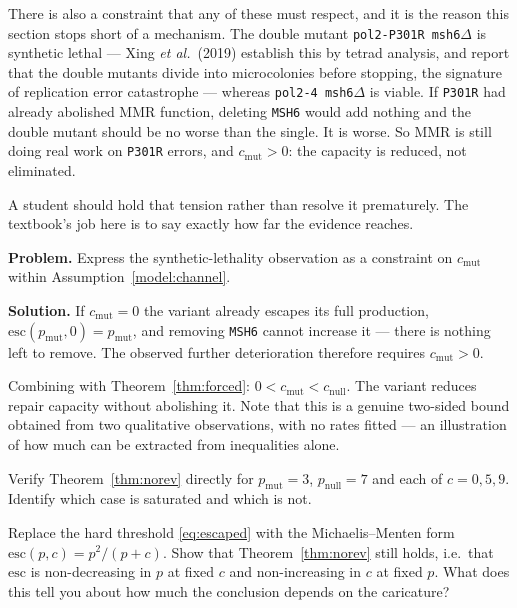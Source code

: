 There is also a constraint that any of these must respect, and it is the reason
this section stops short of a mechanism. The double mutant
\texttt{pol2-P301R msh6$\Delta$} is synthetic lethal --- Xing \emph{et al.}\ (2019)
establish this by tetrad analysis, and report that the double mutants divide into
microcolonies before stopping, the signature of replication error catastrophe ---
whereas \texttt{pol2-4 msh6$\Delta$} is viable. If \texttt{P301R} had already
abolished MMR function, deleting \texttt{MSH6} would add nothing and the double
mutant should be no worse than the single. It is worse. So MMR is still doing
real work on \texttt{P301R} errors, and $c_{\mathrm{mut}} > 0$: the capacity is
reduced, not eliminated.

A student should hold that tension rather than resolve it prematurely. The
textbook's job here is to say exactly how far the evidence reaches.

\begin{worked}
\textbf{Problem.} Express the synthetic-lethality observation as a constraint on
$c_{\mathrm{mut}}$ within Assumption~\ref{model:channel}.

\textbf{Solution.} If $c_{\mathrm{mut}} = 0$ the variant already escapes its full
production, $\mathrm{esc}(p_{\mathrm{mut}}, 0) = p_{\mathrm{mut}}$, and removing
\texttt{MSH6} cannot increase it --- there is nothing left to remove. The observed
further deterioration therefore requires $c_{\mathrm{mut}} > 0$.

Combining with Theorem~\ref{thm:forced}: $0 < c_{\mathrm{mut}} < c_{\mathrm{null}}$.
The variant reduces repair capacity without abolishing it. Note that this is a
genuine two-sided bound obtained from two qualitative observations, with no rates
fitted --- an illustration of how much can be extracted from inequalities alone.
\end{worked}

\begin{exercise}
Verify Theorem~\ref{thm:norev} directly for $p_{\mathrm{mut}} = 3$,
$p_{\mathrm{null}} = 7$ and each of $c = 0, 5, 9$. Identify which case is
saturated and which is not.
\end{exercise}

\begin{exercise}
Replace the hard threshold \eqref{eq:escaped} with the Michaelis--Menten form
$\mathrm{esc}(p,c) = p^2/(p + c)$. Show that Theorem~\ref{thm:norev} still holds,
i.e.\ that $\mathrm{esc}$ is non-decreasing in $p$ at fixed $c$ and
non-increasing in $c$ at fixed $p$. What does this tell you about how much the
conclusion depends on the caricature?
\end{exercise}

